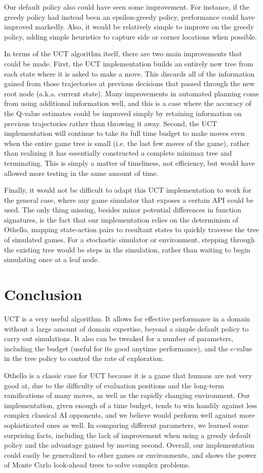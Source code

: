 \documentclass[12pt,letterpaper]{article}
\begin{document}
Our default policy also could have seen some improvement. For instance, if the greedy policy had instead been an epsilon-greedy policy, performance could have improved markedly. Also, it would be relatively simple to improve on the greedy policy, adding simple heuristics to capture side or corner locations when possible.

In terms of the UCT algorithm itself, there are two main improvements that could be made. First, the UCT implementation builds an entirely new tree from each state where it is asked to make a move. This discards all of the information gained from those trajectories at previous decisions that passed through the new root node (a.k.a. current state). Many improvements in automated planning come from using additional information well, and this is a case where the accuracy of the Q-value estimates could be improved simply by retaining information on previous trajectories rather than throwing it away. Second, the UCT implementation will continue to take its full time budget to make moves even when the entire game tree is small (i.e. the last few moves of the game), rather than realizing it has essentially constructed a complete minimax tree and terminating. This is simply a matter of timeliness, not efficiency, but would have allowed more testing in the same amount of time.

Finally, it would not be difficult to adapt this UCT implementation to work for the general case, where any game simulator that exposes a certain API could be used. The only thing missing, besides minor potential differences in function signatures, is the fact that our implementation relies on the determinism of Othello, mapping state-action pairs to resultant states to quickly traverse the tree of simulated games. For a stochastic simulator or environment, stepping through the existing tree would be steps in the simulation, rather than waiting to begin simulating once at a leaf node.

\section{Conclusion}
\label{conc}
UCT is a very useful algorithm. It allows for effective performance in a domain without a large amount of domain expertise, beyond a simple default policy to carry out simulations. It also can be tweaked for a number of parameters, including the budget (useful for its good anytime performance), and the c-value in the tree policy to control the rate of exploration.

Othello is a classic case for UCT because it is a game that humans are not very good at, due to the difficulty of evaluation positions and the long-term ramifications of many moves, as well as the rapidly changing environment. Our implementation, given enough of a time budget, tends to win handily against less complex classical AI opponents, and we believe would perform well against more sophisticated ones as well. In comparing different parameters, we learned some surprising facts, including the lack of improvement when using a greedy default policy and the advantage gained by moving second. Overall, our implementation could easily be generalized to other games or environments, and shows the power of Monte Carlo look-ahead trees to solve complex problems.
\end{document}
